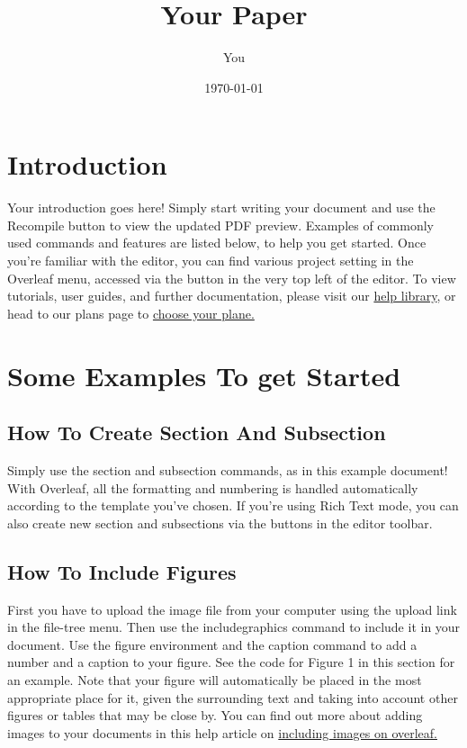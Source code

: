 \documentclass{article}
\title{Your Paper}
\author{You}
\date{\today}
\begin{document}
\maketitle
\section{Introduction}
Your introduction goes here! Simply start writing your document and use the Recompile button to
view the updated PDF preview. Examples of commonly used commands and features are listed below,
to help you get started.
Once you’re familiar with the editor, you can find various project setting in the Overleaf menu,
accessed via the button in the very top left of the editor. To view tutorials, user guides, and further
documentation, please visit our \href{https://www.overleaf.com/learn}{help library}, or head to our plans page to \href{ https://www.overleaf.com/user/subscription/plans}{choose your plane.}
\section{Some Examples To get Started}
\subsection{How To Create Section And Subsection}
Simply use the section and subsection commands, as in this example document! With Overleaf, all
the formatting and numbering is handled automatically according to the template you’ve chosen. If
you’re using Rich Text mode, you can also create new section and subsections via the buttons in the
editor toolbar.
\subsection{How To Include Figures}

First you have to upload the image file from your computer using the upload link in the file-tree menu.
Then use the includegraphics command to include it in your document. Use the figure environment
and the caption command to add a number and a caption to your figure. See the code for Figure 1 in
this section for an example.
Note that your figure will automatically be placed in the most appropriate place for it, given the
surrounding text and taking into account other figures or tables that may be close by. You can find
out more about adding images to your documents in this help article on \href{https://www.overleaf.com/learn/how-to/Including_images_on_Overleaf}{including images on overleaf.}
\end{document}
